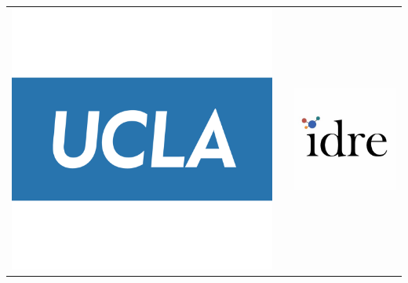 \documentclass[final]{beamer}
\newlength{\onecolwid}
\begin{document}
\begin{frame}[t]
\begin{columns}[t]
\begin{column}{\onecolwid}
\begin{center}
\begin{tabular}{ccc}
\includegraphics[width=0.4\linewidth]{figures/ucla_logo.jpg} & \hfill & \includegraphics[width=0.4\linewidth]{figures/idre_logo.jpg}
\end{tabular}
\end{center}

\end{column} %


\end{columns} %

\end{frame} %
\end{document}
